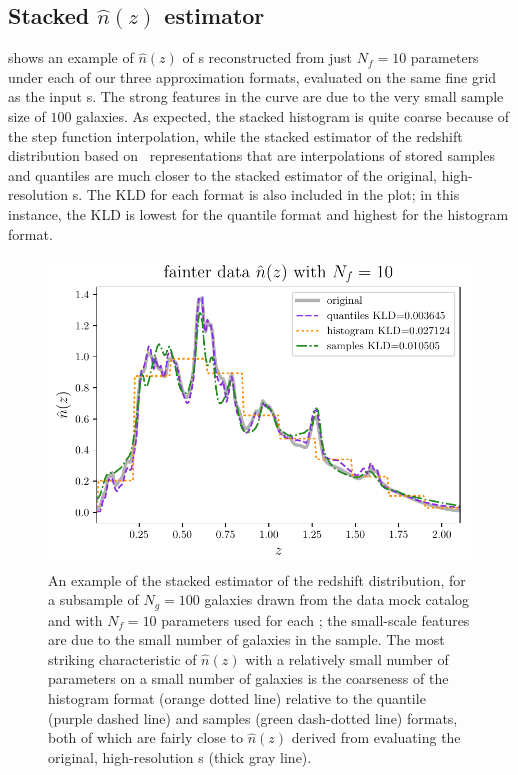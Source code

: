 \subsection{Stacked $\hat{n}(z)$ estimator}

 shows an example of $\hat{n}(z)$ of \pz s 
reconstructed from just $N_{f}=10$ parameters under each of our three 
approximation formats, evaluated on the same fine grid as the input \pz s.
The strong features in the curve are due to the very small sample size of $100$ 
galaxies.
As expected, the stacked histogram is quite coarse because of the step function 
interpolation, while the stacked estimator of the redshift distribution based 
on \pz\ representations that are interpolations of stored samples and quantiles 
are much closer to the stacked estimator of the original, high-resolution \pz s.
The KLD for each format is also included in the plot; in this instance, the KLD 
is lowest for the quantile format and highest for the histogram format.

\begin{figure}
	\begin{center}
		\includegraphics[width=\columnwidth]{figures/qp/stacked.pdf}
		\caption{An example of the stacked estimator of the redshift distribution, 
			for a subsample of $N_{g}=100$ galaxies drawn from the \ssdata data mock 
			catalog and with $N_{f}=10$ parameters used for each \pz; the small-scale 
			features are due to the small number of galaxies in the sample.
			The most striking characteristic of $\hat{n}(z)$ with a relatively small 
			number of parameters on a small number of galaxies is the coarseness of the 
			histogram format (orange dotted line) relative to the quantile (purple dashed 
			line) and samples (green dash-dotted line) formats, both of which are fairly 
			close to $\hat{n}(z)$ derived from evaluating the original, high-resolution \pz 
			s (thick gray line).
			}
	\end{center}
\end{figure}

